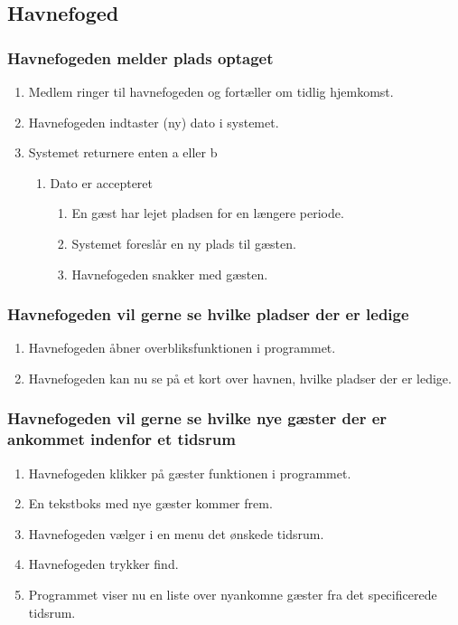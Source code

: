     

\subsection{Havnefoged}

    \subsubsection{Havnefogeden melder plads optaget}

    \begin{enumerate}
      \item Medlem ringer til havnefogeden og fortæller om tidlig hjemkomst.
      \item Havnefogeden indtaster (ny) dato i systemet.
      \item Systemet returnere enten a eller b
      \begin{enumerate}
        \item Dato er accepteret
        \begin{enumerate}
          \item En gæst har lejet pladsen for en længere periode.
          \item Systemet foreslår en ny plads til gæsten.
          \item Havnefogeden snakker med gæsten.
        \end{enumerate}
      \end{enumerate}  
    \end{enumerate}


\subsubsection{Havnefogeden vil gerne se hvilke pladser der er ledige}
    \begin{enumerate}
      \item Havnefogeden åbner overbliksfunktionen i programmet.
      \item Havnefogeden kan nu se på et kort over havnen, hvilke pladser der er ledige.
    \end{enumerate}

    \subsubsection{Havnefogeden vil gerne se hvilke nye gæster der er ankommet indenfor et tidsrum}
    \begin{enumerate}
      \item Havnefogeden klikker på gæster funktionen i programmet.
      \item En tekstboks med nye gæster kommer frem.
      \item Havnefogeden vælger i en menu det ønskede tidsrum.
      \item Havnefogeden trykker find.
      \item Programmet viser nu en liste over nyankomne gæster fra det specificerede tidsrum.
    \end{enumerate}

